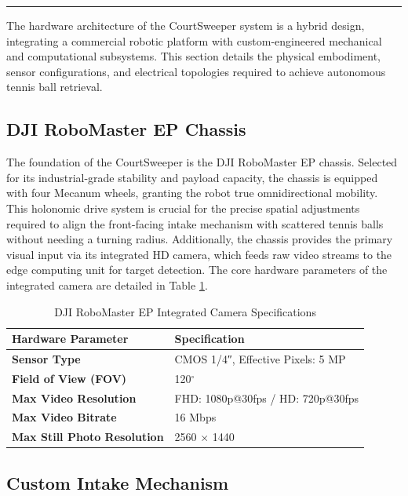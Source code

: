 \label{sec:hardware}

\textcolor{gray}{\rule{\linewidth}{3pt}}


The hardware architecture of the CourtSweeper system is a hybrid design, integrating a commercial robotic platform with custom-engineered mechanical and computational subsystems. This section details the physical embodiment, sensor configurations, and electrical topologies required to achieve autonomous tennis ball retrieval.


\subsection{DJI RoboMaster EP Chassis}
\label{sec:dji_chassis}
The foundation of the CourtSweeper is the DJI RoboMaster EP chassis. Selected for its industrial-grade stability and payload capacity, the chassis is equipped with four Mecanum wheels, granting the robot true omnidirectional mobility. This holonomic drive system is crucial for the precise spatial adjustments required to align the front-facing intake mechanism with scattered tennis balls without needing a turning radius. Additionally, the chassis provides the primary visual input via its integrated HD camera, which feeds raw video streams to the edge computing unit for target detection. The core hardware parameters of the integrated camera are detailed in Table \ref{tab:camera_specs}.

\begin{table}[htbp]
  \footnotesize
  \centering
  \caption{DJI RoboMaster EP Integrated Camera Specifications}
  \label{tab:camera_specs}
  \renewcommand{\arraystretch}{1.2}
  \begin{tabular}{@{}ll@{}}
    \toprule
    \textbf{Hardware Parameter} & \textbf{Specification} \\
    \midrule
    \textbf{Sensor Type} & CMOS 1/4″, Effective Pixels: 5 MP \\
    \textbf{Field of View (FOV)} & 120$^\circ$ \\
    \textbf{Max Video Resolution} & FHD: 1080p@30fps / HD: 720p@30fps \\
    \textbf{Max Video Bitrate} & 16 Mbps \\
    \textbf{Max Still Photo Resolution} & 2560 $\times$ 1440 \\
    \bottomrule
  \end{tabular}
\end{table}


\subsection{Custom Intake Mechanism}
\label{sec:intake_mech}

